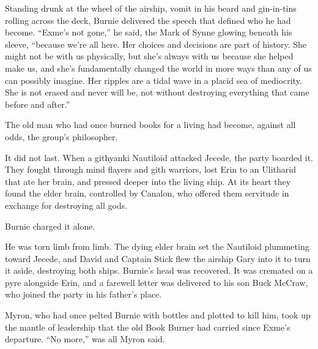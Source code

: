 Standing drunk at the wheel of the airship, vomit in his beard and gin-in-tins rolling across the deck, Burnie delivered the speech that defined who he had become.  ``Exme's not gone,'' he said, the Mark of Synne glowing beneath his sleeve, ``because we're all here.  Her choices and decisions are part of history.  She might not be with us physically, but she's always with us because she helped make us, and she's fundamentally changed the world in more ways than any of us can possibly imagine.  Her ripples are a tidal wave in a placid sea of mediocrity.  She is not erased and never will be, not without destroying everything that came before and after.''

The old man who had once burned books for a living had become, against all odds, the group's philosopher.

It did not last.  When a githyanki Nautiloid attacked Jecede, the party boarded it.  They fought through mind flayers and gith warriors, lost Erin to an Ulitharid that ate her brain, and pressed deeper into the living ship.  At its heart they found the elder brain, controlled by Canalon, who offered them servitude in exchange for destroying all gods.

Burnie charged it alone.

He was torn limb from limb.  The dying elder brain set the Nautiloid plummeting toward Jecede, and David and Captain Stick flew the airship Gary into it to turn it aside, destroying both ships.  Burnie's head was recovered.  It was cremated on a pyre alongside Erin, and a farewell letter was delivered to his son Buck McCraw, who joined the party in his father's place.

Myron, who had once pelted Burnie with bottles and plotted to kill him, took up the mantle of leadership that the old Book Burner had carried since Exme's departure.  ``No more,'' was all Myron said.

\clearpage
